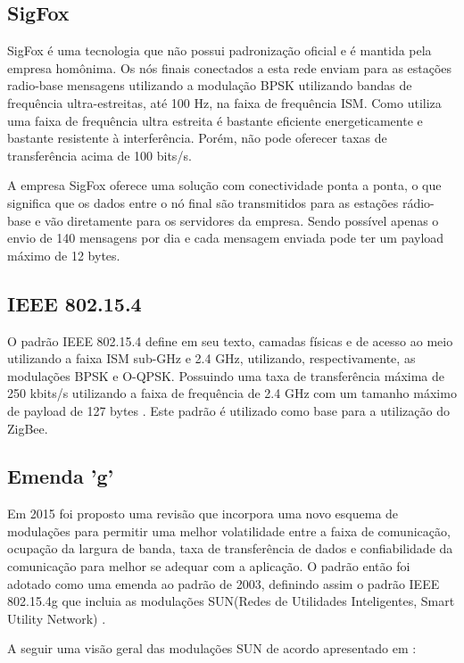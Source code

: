 \subsection{SigFox}
SigFox é uma tecnologia que não possui padronização oficial e é mantida pela empresa homônima. Os nós finais conectados a esta rede enviam para as estações radio-base mensagens utilizando a modulação BPSK utilizando bandas de frequência ultra-estreitas, até 100 Hz, na faixa de frequência ISM. Como utiliza uma faixa de frequência ultra estreita é bastante eficiente energeticamente e bastante resistente à interferência. Porém, não pode oferecer taxas de transferência acima de 100 bits/s.

A empresa SigFox oferece uma solução com conectividade ponta a ponta, o que significa que os dados entre o nó final são transmitidos para as estações rádio-base e vão diretamente para os servidores da empresa. Sendo possível apenas o envio de 140 mensagens por dia e cada mensagem enviada pode ter um payload máximo de 12 bytes.

\subsection{IEEE 802.15.4}
O padrão IEEE 802.15.4 define em seu texto, camadas físicas e de acesso ao meio utilizando a faixa ISM sub-GHz e 2.4 GHz, utilizando, respectivamente, as modulações BPSK e O-QPSK. Possuindo uma taxa de transferência máxima de 250 kbits/s utilizando a faixa de frequência de 2.4 GHz com um tamanho máximo de payload de 127 bytes \cite{munoz2018overview} \cite{gomes2017estimaccao}. Este padrão é utilizado como base para a utilização do ZigBee.

\subsection*{Emenda 'g'}
Em 2015 foi proposto uma revisão que incorpora uma novo esquema de modulações para permitir uma melhor volatilidade entre a faixa de comunicação, ocupação da largura de banda, taxa de transferência de dados e confiabilidade da comunicação para melhor se adequar com a aplicação. O padrão então foi adotado como uma emenda ao padrão de 2003, definindo assim o padrão IEEE 802.15.4g que incluia as modulações SUN(Redes de Utilidades Inteligentes, Smart Utility Network) \cite{tuset2020reliability}.

A seguir uma visão geral das modulações SUN de acordo apresentado em \cite{tuset2020reliability}:

